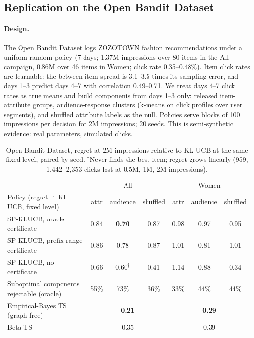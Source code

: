 \documentclass[11pt]{article}
\theoremstyle{definition}
\theoremstyle{remark}
\begin{document}
\subsection{Replication on the Open Bandit Dataset}

\paragraph{Design.} The Open Bandit Dataset logs ZOZOTOWN fashion recommendations under a uniform-random policy (7 days; 1.37M impressions over 80 items in the All campaign, 0.86M over 46 items in Women; click rate 0.35--0.48\%). Item click rates are learnable: the between-item spread is 3.1--3.5 times its sampling error, and days 1--3 predict days 4--7 with correlation 0.49--0.71. We treat days 4--7 click rates as true means and build components from days 1--3 only: released item-attribute groups, audience-response clusters (k-means on click profiles over user segments), and shuffled attribute labels as the null. Policies serve blocks of 100 impressions per decision for 2M impressions; 20 seeds. This is semi-synthetic evidence: real parameters, simulated clicks.

\begin{table}[t]\centering\small
\begin{tabular}{lcccccc}
\toprule
& \multicolumn{3}{c}{All} & \multicolumn{3}{c}{Women} \\
Policy (regret $\div$ KL-UCB, fixed level) & attr & audience & shuffled & attr & audience & shuffled \\
\midrule
SP-KLUCB, oracle certificate & 0.84 & \textbf{0.70} & 0.87 & 0.98 & 0.97 & 0.95 \\
SP-KLUCB, prefix-range certificate & 0.86 & 0.78 & 0.87 & 1.01 & 0.81 & 1.01 \\
SP-KLUCB, no certificate & 0.66 & 0.60$^\dagger$ & 0.41 & 1.14 & 0.88 & 0.34 \\
Suboptimal components rejectable (oracle) & 55\% & 73\% & 36\% & 33\% & 44\% & 44\% \\
\midrule
Empirical-Bayes TS (graph-free) & \multicolumn{3}{c}{\textbf{0.21}} & \multicolumn{3}{c}{\textbf{0.29}} \\
Beta TS & \multicolumn{3}{c}{0.35} & \multicolumn{3}{c}{0.39} \\
\bottomrule
\end{tabular}
\caption{Open Bandit Dataset, regret at 2M impressions relative to KL-UCB at the same fixed level, paired by seed. $^\dagger$Never finds the best item; regret grows linearly (959, 1,442, 2,353 clicks lost at 0.5M, 1M, 2M impressions).}\label{tab:obd}
\end{table}
\end{document}
